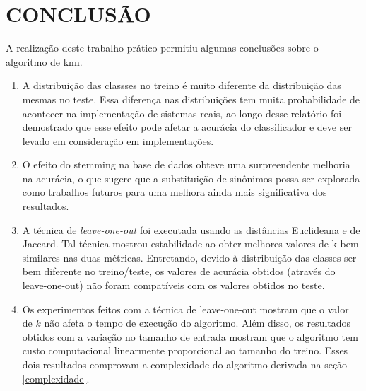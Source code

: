 \documentclass[a4paper, 11 pt, onecolumn]{article}   %
\begin{document}
\pagebreak

\section{CONCLUSÃO}
A realização deste trabalho prático permitiu algumas conclusões sobre o algoritmo de knn.
\begin{enumerate}
 \item A distribuição das classses no treino é muito diferente da distribuição das mesmas no teste. Essa diferença nas distribuições tem muita probabilidade de acontecer na implementação de sistemas reais, ao longo desse relatório foi demostrado que esse efeito pode afetar a acurácia do classificador e deve ser levado em consideração em implementações.
\item O efeito do stemming na base de dados obteve uma surpreendente melhoria na acurácia, o que sugere que a substituição de sinônimos possa ser explorada como trabalhos futuros para uma melhora ainda mais significativa dos resultados.
\item A técnica de \textit{leave-one-out} foi executada usando as distâncias Euclideana e de Jaccard. Tal técnica mostrou estabilidade ao obter melhores valores de k bem similares nas duas métricas. Entretando, devido à distribuição das classes ser bem diferente no treino/teste, os valores de acurácia obtidos (através do leave-one-out) não foram compatíveis com os valores obtidos no teste.

\item Os experimentos feitos com a técnica de leave-one-out mostram que o valor de $k$ não afeta o tempo de execução do algoritmo. Além disso, os resultados obtidos com a variação no tamanho de entrada mostram que o algoritmo tem custo computacional linearmente proporcional ao tamanho do treino. Esses dois resultados comprovam a complexidade do algoritmo derivada na seção \ref{complexidade}.

\end{enumerate}

\nocite{meira}
\nocite{urlMetrics}



\end{document}
